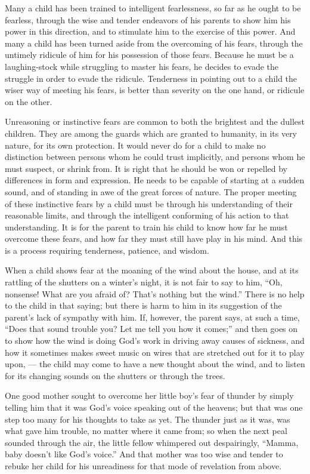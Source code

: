 \documentclass[
]{book}
\begin{document}
Many a child has been trained to intelligent fearlessness, so far as he ought to be fearless, through the wise and tender endeavors of his parents to show him his power in this direction, and to stimulate him to the exercise of this power. And many a child has been turned aside from the overcoming of his fears, through the untimely ridicule of him for his possession of those fears. Because he must be a laughing-stock while struggling to master his fears, he decides to evade the struggle in order to evade the ridicule. Tenderness in pointing out to a child the wiser way of meeting his fears, is better than severity on the one hand, or ridicule on the other.

Unreasoning or instinctive fears are common to both the brightest and the dullest children. They are among the guards which are granted to humanity, in its very nature, for its own protection. It would never do for a child to make no distinction between persons whom he could trust implicitly, and persons whom he must suspect, or shrink from. It is right that he should be won or repelled by differences in form and expression. He needs to be capable of starting at a sudden sound, and of standing in awe of the great forces of nature. The proper meeting of these instinctive fears by a child must be through his understanding of their reasonable limits, and through the intelligent conforming of his action to that understanding. It is for the parent to train his child to know how far he must overcome these fears, and how far they must still have play in his mind. And this is a process requiring tenderness, patience, and wisdom.

When a child shows fear at the moaning of the wind about the house, and at its rattling of the shutters on a winter's night, it is not fair to say to him, ``Oh, nonsense! What are you afraid of? That's nothing but the wind.'' There is no help to the child in that saying; but there is harm to him in its suggestion of the parent's lack of sympathy with him. If, however, the parent says, at such a time, ``Does that sound trouble you? Let me tell you how it comes;'' and then goes on to show how the wind is doing God's work in driving away causes of sickness, and how it sometimes makes sweet music on wires that are stretched out for it to play upon, --- the child may come to have a new thought about the wind, and to listen for its changing sounds on the shutters or through the trees.

One good mother sought to overcome her little boy's fear of thunder by simply telling him that it was God's voice speaking out of the heavens; but that was one step too many for his thoughts to take as yet. The thunder just as it was, was what gave him trouble, no matter where it came from; so when the next peal sounded through the air, the little fellow whimpered out despairingly, ``Mamma, baby doesn't like God's voice.'' And that mother was too wise and tender to rebuke her child for his unreadiness for that mode of revelation from above.
\end{document}

